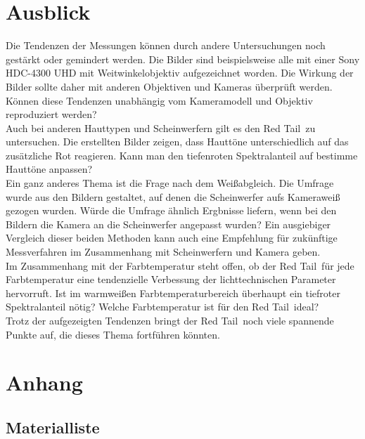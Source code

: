 \chapter{Ausblick}
Die Tendenzen der Messungen können durch andere Untersuchungen noch gestärkt oder gemindert werden.
Die Bilder sind beispielsweise alle mit einer Sony HDC-4300 UHD mit Weitwinkelobjektiv aufgezeichnet worden. Die Wirkung der Bilder sollte daher mit anderen Objektiven und Kameras überprüft werden. Können diese Tendenzen unabhängig vom Kameramodell und Objektiv reproduziert werden?\\
Auch bei anderen Hauttypen und Scheinwerfern gilt es den \glqq Red Tail\grqq\ zu untersuchen. Die erstellten Bilder zeigen, dass Hauttöne unterschiedlich auf das zusätzliche Rot reagieren. Kann man den tiefenroten Spektralanteil auf bestimme Hauttöne anpassen? \\
Ein ganz anderes Thema ist die Frage nach dem Weißabgleich. Die Umfrage wurde aus den Bildern gestaltet, auf denen die Scheinwerfer aufs Kameraweiß gezogen wurden. Würde die Umfrage ähnlich Ergbnisse liefern, wenn bei den Bildern die Kamera an die Scheinwerfer angepasst wurden? Ein ausgiebiger Vergleich dieser beiden Methoden kann auch eine Empfehlung für zukünftige Messverfahren im Zusammenhang mit Scheinwerfern und Kamera geben.\\
Im Zusammenhang mit der Farbtemperatur steht offen, ob der \glqq Red Tail\grqq\ für jede Farbtemperatur eine tendenzielle Verbessung der lichttechnischen Parameter hervorruft. Ist im warmweißen Farbtemperaturbereich überhaupt ein tiefroter Spektralanteil nötig? Welche Farbtemperatur ist für den \glqq Red Tail\grqq\ ideal?\\
Trotz der aufgezeigten Tendenzen bringt der \glqq Red Tail\grqq\ noch viele spannende Punkte auf, die dieses Thema fortführen könnten.   



\listoffigures %
\listoftables %


\chapter{Anhang}

\section{Materialliste}

